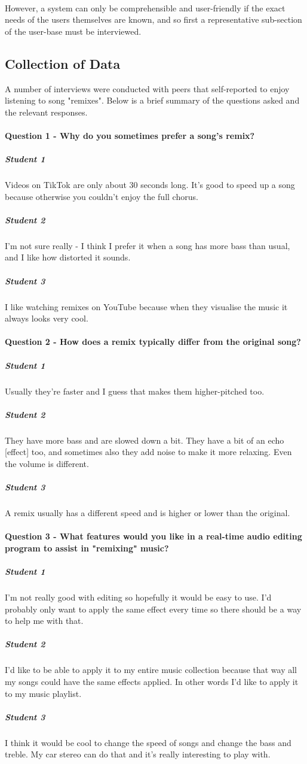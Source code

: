 \documentclass{article}
\begin{document}
	\paragraph{}
	However, a system can only be comprehensible and user-friendly if the exact needs of the users themselves are known, and so first a representative sub-section of the user-base must be interviewed.
	
	\subsection{Collection of Data}
	A number of interviews were conducted with peers that self-reported to enjoy listening to song "remixes". Below is a brief summary of the questions asked and the relevant responses.
	
	\paragraph{Question 1 - Why do you sometimes prefer a song's remix?}
	\subparagraph{Student 1}
	Videos on TikTok are only about 30 seconds long. It's good to speed up a song because otherwise you couldn't enjoy the full chorus.
	\subparagraph{Student 2}
	I'm not sure really - I think I prefer it when a song has more bass than usual, and I like how distorted it sounds.
	\subparagraph{Student 3}
	I like watching remixes on YouTube because when they visualise the music it always looks very cool.
	
	\paragraph{Question 2 - How does a remix typically differ from the original song?}
	\subparagraph{Student 1}
	Usually they're faster and I guess that makes them higher-pitched too.
	\subparagraph{Student 2}
	They have more bass and are slowed down a bit. They have a bit of an echo {[effect]} too, and sometimes also they add noise to make it more relaxing. Even the volume is different.
	\subparagraph{Student 3}
	A remix usually has a different speed and is higher or lower than the original.
	
	\paragraph{Question 3 - What features would you like in a real-time audio editing program to assist in "remixing" music?}
	\subparagraph{Student 1}
	I'm not really good with editing so hopefully it would be easy to use. I'd probably only want to apply the same effect every time so there should be a way to help me with that.
	\subparagraph{Student 2}
	I'd like to be able to apply it to my entire music collection because that way all my songs could have the same effects applied. In other words I'd like to apply it to my music playlist.
	\subparagraph{Student 3}
	I think it would be cool to change the speed of songs and change the bass and treble. My car stereo can do that and it's really interesting to play with.
\end{document}
